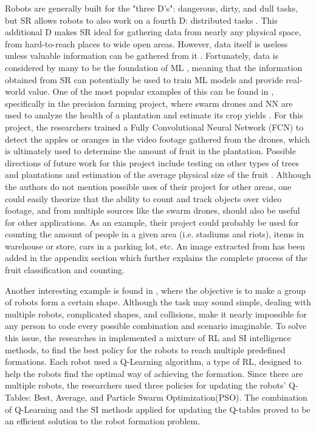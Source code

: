 \documentclass[twocolumn]{bmcart}%
\begin{document}
Robots are generally built for the "three D's": dangerous, dirty, and dull tasks, but SR allows robots to also work on a fourth D: distributed tasks \cite{CHF}. This additional D makes SR ideal for gathering data from nearly any physical space, from hard-to-reach places to wide open areas. However, data itself is useless unless valuable information can be gathered from it \cite{Welling}. Fortunately, data is considered by many to be the foundation of ML \cite{Corea, Sundblad}, meaning that the information obtained from SR can potentially be used to train ML models and provide real-world value. One of the most popular examples of this can be found in \cite{Kumar2019}, specifically in the precision farming project, where swarm drones and NN are used to analyze the health of a plantation and estimate its crop yields \cite{TED,AMNH}. For this project, the researchers trained a Fully Convolutional Neural Network (FCN) to detect the apples or oranges in the video footage gathered from the drones, which is ultimately used to determine the amount of fruit in the plantation. Possible directions of future work for this project include testing on other types of trees and plantations and estimation of the average physical size of the fruit \cite{Kumar2018}. Although the authors do not mention possible uses of their project for other areas, one could easily theorize that the ability to count and track objects over video footage, and from multiple sources like the swarm drones, should also be useful for other applications. As an example, their project could probably be used for counting the amount of people in a given area (i.e. stadiums and riots), items in warehouse or store, cars in a parking lot, etc.  An image extracted from \cite{Kumar2018} has been added in the appendix section which further explains the complete process of the fruit classification and counting. 

Another interesting example is found in \cite{Iima}, where the objective is to make a group of robots form a certain shape. Although the task may sound simple, dealing with multiple robots, complicated shapes, and collisions, make it nearly impossible for any person to code every possible combination and scenario imaginable. To solve this issue, the researches in \cite{Iima} implemented a mixture of RL and SI intelligence methods, to find the best policy for the robots to reach multiple predefined formations. Each robot used a Q-Learning algorithm, a type of RL, designed to help the robots find the optimal way of achieving the formation. Since there are multiple robots, the researchers used three policies for updating the robots' Q-Tables: Best, Average, and Particle Swarm Optimization(PSO). The combination of Q-Learning and the SI methods applied for updating the Q-tables proved to be an efficient solution to the robot formation problem.  
\end{document}
